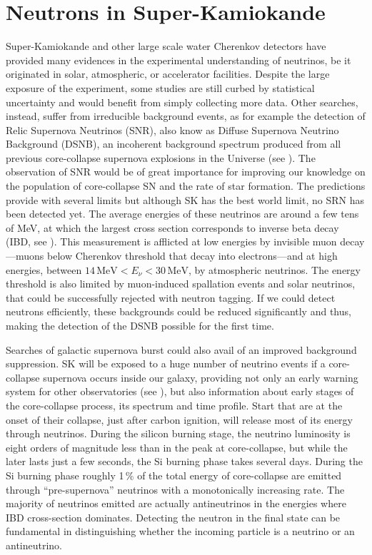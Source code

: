 \section{Neutrons in Super-Kamiokande}
\label{sec:sk_neutron}


Super-Kamiokande and other large scale water Cherenkov detectors have provided %
many evidences in the experimental understanding of neutrinos, %
be it originated in solar, atmospheric, or accelerator facilities.
Despite the large exposure of the experiment, some studies are still curbed by statistical uncertainty %
and would benefit from simply collecting more data.
Other searches, instead, suffer from irreducible background events, as for example the detection of Relic Supernova Neutrinos (SNR), %
also know as Diffuse Supernova Neutrino Background (DSNB), an incoherent background spectrum %
produced from all previous core-collapse supernova explosions in the Universe (see ).
The observation of SNR would be of great importance for improving our knowledge on the population of core-collapse SN %
and the rate of star formation.
The predictions provide with several limits but although SK has the best world limit, no SRN has been detected yet.
The average energies of these neutrinos are around a few tens of MeV, at which the largest cross section %
corresponds to inverse beta decay (IBD, see ).
This measurement is afflicted at low energies by invisible muon decay%
---muons below Cherenkov threshold that decay into electrons---and at high energies, %
between $14\,\text{MeV} < E_\nu < 30\,\text{MeV}$, by atmospheric neutrinos.
The energy threshold is also limited by muon-induced spallation events and solar neutrinos, that could be successfully %
rejected with neutron tagging.
If we could detect neutrons efficiently, these backgrounds could be reduced significantly and thus, %
making the detection of the DSNB possible for the first time.

Searches of galactic supernova burst could also avail of an improved background suppression.
SK will be exposed to a huge number of neutrino events if a core-collapse supernova occurs inside our galaxy, %
providing not only an early warning system for other observatories (see ), %
but also information about early stages of the core-collapse process, its spectrum and time profile.
Start that are at the onset of their collapse, just after carbon ignition, will release most of its energy through neutrinos.
During the silicon burning stage, the neutrino luminosity is eight orders of magnitude less than %
in the peak at core-collapse, but while the later lasts just a few seconds, %
the Si burning phase takes several days.
During the Si burning phase roughly 1\,\% of the total energy of core-collapse are emitted through
``pre-supernova'' neutrinos with a monotonically increasing rate.
The majority of neutrinos emitted are actually antineutrinos in the energies where IBD cross-section dominates.
Detecting the neutron in the final state can be fundamental in distinguishing whether the incoming particle is %
a neutrino or an antineutrino.

